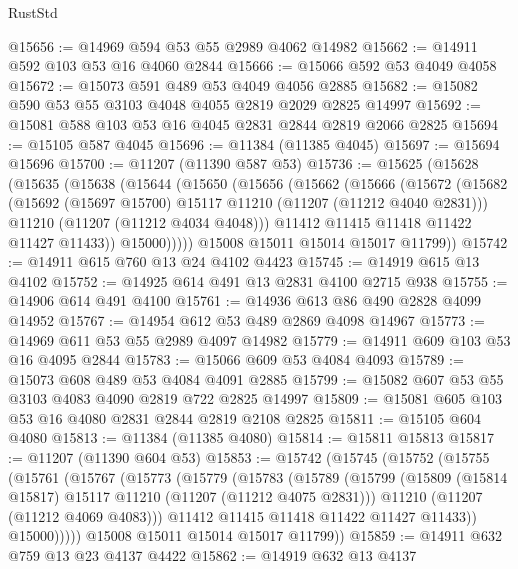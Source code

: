 \begin{lexlean}{RustStd}
\begin{coremodule}
@15656 := @14969 @594 @53 @55 @2989 @4062 @14982
@15662 := @14911 @592 @103 @53 @16 @4060 @2844
@15666 := @15066 @592 @53 @4049 @4058
@15672 := @15073 @591 @489 @53 @4049 @4056 @2885
@15682 := @15082 @590 @53 @55 @3103 @4048 @4055 @2819 @2029 @2825 @14997
@15692 := @15081 @588 @103 @53 @16 @4045 @2831 @2844 @2819 @2066 @2825
@15694 := @15105 @587 @4045
@15696 := @11384 (@11385 @4045)
@15697 := @15694 @15696
@15700 := @11207 (@11390 @587 @53)
@15736 := @15625
    (@15628
      (@15635
        (@15638
          (@15644
            (@15650
              (@15656
                (@15662
                  (@15666
                    (@15672
                      (@15682
                        (@15692 (@15697 @15700) @15117 @11210 (@11207 (@11212 @4040 @2831)))
                        @11210
                        (@11207 (@11212 @4034 @4048)))
                      @11412
                      @11415
                      @11418
                      @11422
                      @11427
                      @11433))
                  @15000)))))
        @15008
        @15011
        @15014
        @15017
        @11799))
@15742 := @14911 @615 @760 @13 @24 @4102 @4423
@15745 := @14919 @615 @13 @4102
@15752 := @14925 @614 @491 @13 @2831 @4100 @2715 @938
@15755 := @14906 @614 @491 @4100
@15761 := @14936 @613 @86 @490 @2828 @4099 @14952
@15767 := @14954 @612 @53 @489 @2869 @4098 @14967
@15773 := @14969 @611 @53 @55 @2989 @4097 @14982
@15779 := @14911 @609 @103 @53 @16 @4095 @2844
@15783 := @15066 @609 @53 @4084 @4093
@15789 := @15073 @608 @489 @53 @4084 @4091 @2885
@15799 := @15082 @607 @53 @55 @3103 @4083 @4090 @2819 @722 @2825 @14997
@15809 := @15081 @605 @103 @53 @16 @4080 @2831 @2844 @2819 @2108 @2825
@15811 := @15105 @604 @4080
@15813 := @11384 (@11385 @4080)
@15814 := @15811 @15813
@15817 := @11207 (@11390 @604 @53)
@15853 := @15742
    (@15745
      (@15752
        (@15755
          (@15761
            (@15767
              (@15773
                (@15779
                  (@15783
                    (@15789
                      (@15799
                        (@15809 (@15814 @15817) @15117 @11210 (@11207 (@11212 @4075 @2831)))
                        @11210
                        (@11207 (@11212 @4069 @4083)))
                      @11412
                      @11415
                      @11418
                      @11422
                      @11427
                      @11433))
                  @15000)))))
        @15008
        @15011
        @15014
        @15017
        @11799))
@15859 := @14911 @632 @759 @13 @23 @4137 @4422
@15862 := @14919 @632 @13 @4137

\end{coremodule}
\end{lexlean}
